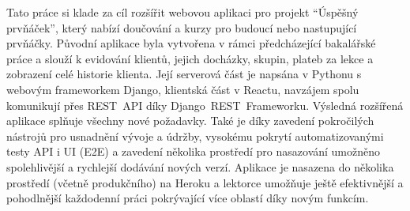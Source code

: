 Tato práce si klade za cíl rozšířit webovou aplikaci pro projekt \enquote{Úspěšný prvňáček}, který nabízí doučování a kurzy pro budoucí nebo nastupující prvňáčky. Původní aplikace byla vytvořena v rámci předcházející bakalářské práce a slouží k evidování klientů, jejich docházky, skupin, plateb za lekce a zobrazení celé historie klienta. Její serverová část je napsána v Pythonu s webovým frameworkem Django, klientská část v Reactu, navzájem spolu komunikují přes REST~API díky Django~REST~Frameworku. Výsledná rozšířená aplikace splňuje všechny nové požadavky. Také je díky zavedení pokročilých nástrojů pro usnadnění vývoje a údržby, vysokému pokrytí automatizovanými testy API i UI (E2E) a zavedení několika prostředí pro nasazování umožněno spolehlivější a rychlejší dodávání nových verzí. Aplikace je nasazena do několika prostředí (včetně produkčního) na Heroku a lektorce umožňuje ještě efektivnější a pohodlnější každodenní práci pokrývající více oblastí díky novým funkcím.
